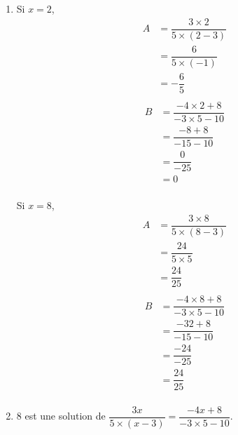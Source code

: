 \documentclass[noheader]{évaluation}
\begin{document}
\begin{exercice}
	\begin{enumerate}
		\item  \begin{multicols}{3}
			      Si $x = 2$,
			      \columnbreak
			      \begin{align*}
				      A & = \dfrac{3 × 2}{5 × (2 - 3)} \\
				        & = \dfrac{6}{5 × (-1)}        \\
				        & = -\dfrac{6}{5}              \\
			      \end{align*}
			      \columnbreak
			      \begin{align*}
				      B & = \dfrac{-4 × 2 + 8}{-3 × 5 - 10} \\
				        & = \dfrac{-8 + 8}{-15 - 10}        \\
				        & = \dfrac{0}{-25}                  \\
				        & = 0                               \\
			      \end{align*}
		      \end{multicols}


		      \begin{multicols}{3}
			      Si $x = 8$,
			      \columnbreak
			      \begin{align*}
				      A & = \dfrac{3 × 8}{5 × (8 - 3)} \\
				        & = \dfrac{24}{5 × 5}          \\
				        & = \dfrac{24}{25}             \\
			      \end{align*}
			      \columnbreak
			      \begin{align*}
				      B & = \dfrac{-4 × 8 + 8}{-3 × 5 - 10} \\
				        & = \dfrac{-32 + 8}{-15 - 10}       \\
				        & = \dfrac{-24}{-25}                \\
				        & = \dfrac{24}{25}                  \\
			      \end{align*}
		      \end{multicols}
		\item $8$ est une solution de $\dfrac{3x}{5 × (x - 3)} = \dfrac{-4x + 8}{-3 × 5 - 10}$.
	\end{enumerate}
\end{exercice}
\end{document}
